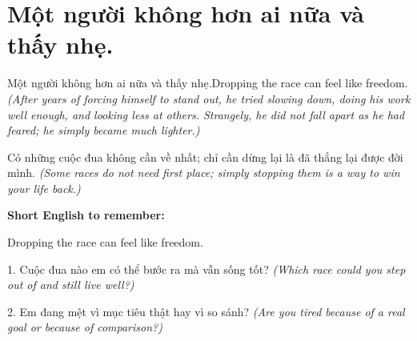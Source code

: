 \section{Một người không hơn ai nữa và thấy nhẹ.}
\begin{truyen}{Một người không hơn ai nữa và thấy nhẹ.}{Dropping the race can feel like freedom.}
\textit{(After years of forcing himself to stand out, he tried slowing down, doing his work well enough, and looking less at others. Strangely, he did not fall apart as he had feared; he simply became much lighter.)}
\end{truyen}
\begin{baihoc}
Có những cuộc đua không cần về nhất; chỉ cần dừng lại là đã thắng lại được đời mình.
\textit{(Some races do not need first place; simply stopping them is a way to win your life back.)}
\end{baihoc}
\begin{ghinhoanh}\textbf{Short English to remember:}

Dropping the race can feel like freedom.
\end{ghinhoanh}
\begin{tuhocnhanh}
1. Cuộc đua nào em có thể bước ra mà vẫn sống tốt? \textit{(Which race could you step out of and still live well?)}

2. Em đang mệt vì mục tiêu thật hay vì so sánh? \textit{(Are you tired because of a real goal or because of comparison?)}
\end{tuhocnhanh}
\ngancach

